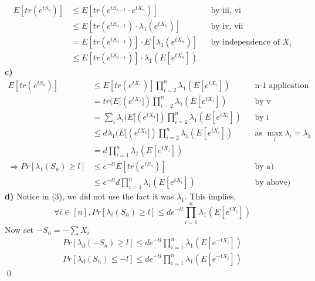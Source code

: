 \documentclass[11pt]{article}
\begin{document}
\begin{align}
E[tr(e^{tS_n})] &\leq E[tr(e^{tS_{n-1}} \cdot e^{tX_n})] && \text{by iii, vi} \\
&\leq E[tr(e^{tS_{n-1}}) \cdot \lambda_1(e^{tX_n})] && \text{by iv, vii} \\
&= E[tr(e^{tS_{n-1}})] \cdot E[\lambda_1(e^{tX_n})] && \text{by independence of $X_i$} \\
&\leq E[tr(e^{tS_{n-1}})] \cdot \lambda_1(E[e^{tX_n}])
\end{align}
\textbf{c)} 
\begin{align}
E[tr(e^{tS_n})] &\leq E[tr(e^{tX_1})]\prod_{i=2}^n \lambda_1(E[e^{tX_i}]) && \text{n-1 application of part b}\\
&= tr(E[(e^{tX_1}])\prod_{i=2}^n \lambda_1(E[e^{tX_i}]) && \text{by v}\\
&= \sum_i \lambda_i(E[(e^{tX_1}])\prod_{i=2}^n \lambda_1(E[e^{tX_i}]) && \text{by i}\\
&\leq d \lambda_1(E[(e^{tX_1}])\prod_{i=2}^n \lambda_1(E[e^{tX_i}]) && \text{as $\max_i \lambda_i = \lambda_1$}\\
&= d \prod_{i=1}^n \lambda_1(E[e^{tX_i}])\\
\Rightarrow Pr[\lambda_1(S_n) \geq l] &\leq e^{-tl} E[tr(e^{tS_n})] && \text{by a)} \\
&\leq e^{-tl}d \prod_{i=1}^n \lambda_1(E[e^{tX_i}])   && \text{by above)}
\end{align}
\textbf{d)} Notice in (3), we did not use the fact it was $\lambda_1$. This implies, 
$$\forall i\in [n], Pr[\lambda_i(S_n) \geq l] \leq d e^{-tl} \prod_{i=1}^n \lambda_1(E[e^{tX_i}])$$
Now set $-S_n = -\sum X_i$
\begin{align}
Pr[\lambda_d(-S_n) \geq l] \leq d e^{-tl} \prod_{i=1}^n \lambda_1(E[e^{-tX_i}]) \\
Pr[\lambda_d(S_n) \leq -l] \leq d e^{-tl} \prod_{i=1}^n \lambda_1(E[e^{-tX_i}])
\end{align}
\qed
\end{document}
